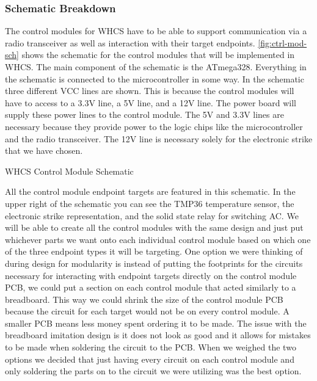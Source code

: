 
\subsubsection{Schematic Breakdown}
The control modules for WHCS have to be able to support communication via a
radio transceiver as well as interaction with their target endpoints.
\autoref{fig:ctrl-mod-sch} shows the schematic for the control modules that will be
implemented in WHCS. The main component of the schematic is the ATmega328.
Everything in the schematic is connected to the microcontroller in some way. In
the schematic three different VCC lines are shown. This is because the control
modules will have to access to a 3.3V line, a 5V line, and a 12V line. The
power board will supply these power lines to the control module. The 5V and
3.3V lines are necessary because they provide power to the logic chips like the
microcontroller and the radio transceiver. The 12V line is necessary solely for
the electronic strike that we have chosen.

{WHCS Control Module Schematic}

All the control module endpoint targets are featured in this
schematic. In the upper right of the schematic you can see the TMP36
temperature sensor, the electronic strike representation, and the solid state
relay for switching AC. We will be able to create all the control modules
with the same design and just put whichever parts we want onto each
individual control module based on which one of the three endpoint types it
will be targeting. One option we were thinking of during design for
modularity is instead of putting the footprints for the circuits necessary
for interacting with endpoint targets directly on the control module PCB, we
could put a section on each control module that acted similarly to a
breadboard. This way we could shrink the size of the control module PCB
because the circuit for each target would not be on every control module. A
smaller PCB means less money spent ordering it to be made. The issue with the
breadboard imitation design is it does not look as good and it allows for
mistakes to be made when soldering the circuit to the PCB. When we weighed
the two options we decided that just having every circuit on each control
module and only soldering the parts on to the circuit we were utilizing was the
best option.

